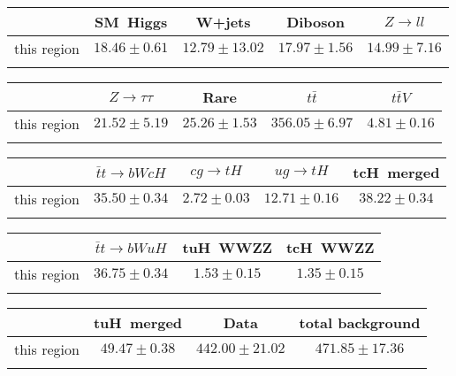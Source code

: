 \centering
\begin{tabular}{ccccc} \toprule\toprule
 & SM~Higgs & W+jets & Diboson & $Z\to ll$\\\midrule
this region & $18.46\pm0.61$ & $12.79\pm13.02$ & $17.97\pm1.56$ & $14.99\pm7.16$\\
\bottomrule\bottomrule\\
\end{tabular}
\begin{tabular}{ccccc} \toprule\toprule
 & $Z\to \tau\tau$ & Rare & $t\bar{t}$ & $t\bar{t}V$\\\midrule
this region & $21.52\pm5.19$ & $25.26\pm1.53$ & $356.05\pm6.97$ & $4.81\pm0.16$\\
\bottomrule\bottomrule\\
\end{tabular}
\begin{tabular}{ccccc} \toprule\toprule
 & $\bar{t}t\to bWcH$ & $cg\to tH$ & $ug\to tH$ & tcH~merged\\\midrule
this region & $35.50\pm0.34$ & $2.72\pm0.03$ & $12.71\pm0.16$ & $38.22\pm0.34$\\
\bottomrule\bottomrule\\
\end{tabular}
\begin{tabular}{cccc} \toprule\toprule
 & $\bar{t}t\to bWuH$ & tuH~WWZZ & tcH~WWZZ\\\midrule
this region & $36.75\pm0.34$ & $1.53\pm0.15$ & $1.35\pm0.15$\\
\bottomrule\bottomrule\\
\end{tabular}
\begin{tabular}{cccc} \toprule\toprule
 & tuH~merged & Data & total background\\\midrule
this region & $49.47\pm0.38$ & $442.00\pm21.02$ & $471.85\pm17.36$\\
\bottomrule\bottomrule\\
\end{tabular}
